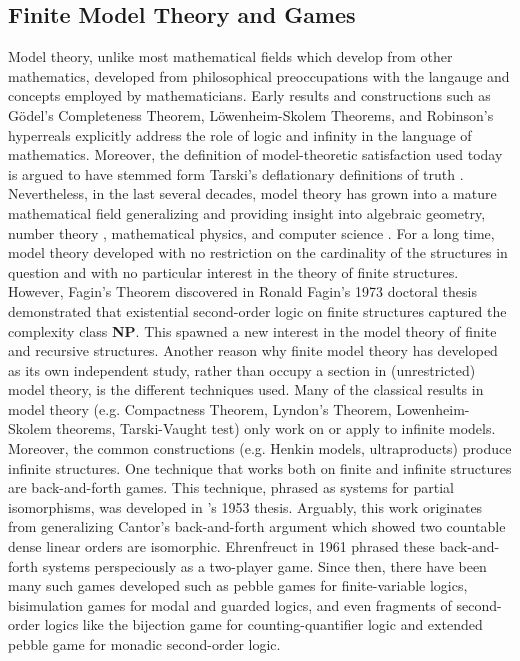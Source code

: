 \subsection{Finite Model Theory and Games}
Model theory, unlike most mathematical fields which develop from other mathematics, developed from philosophical preoccupations with the langauge and concepts employed by mathematicians. Early results and constructions such as G{\"o}del's Completeness Theorem, L{\"o}wenheim-Skolem Theorems, and Robinson's hyperreals explicitly address the role of logic and infinity in the language of mathematics. Moreover, the definition of model-theoretic satisfaction used today is argued to have stemmed form Tarski's deflationary definitions of truth \cite[]{Mancosu2010}. Nevertheless, in the last several decades, model theory has grown into a mature mathematical field generalizing and providing insight into algebraic geometry,  number theory , mathematical physics, and computer science . For a long time, model theory developed with no restriction on the cardinality of the structures in question and with no particular interest in the theory of finite structures. However, Fagin's Theorem discovered in Ronald Fagin's 1973 doctoral thesis demonstrated that existential second-order logic on finite structures captured the complexity class \textbf{NP}. This spawned a new interest in the model theory of finite and recursive structures.  Another reason why finite model theory has developed as its own independent study, rather than occupy a section in (unrestricted) model theory, is the different techniques used. Many of the classical results in model theory (e.g. Compactness Theorem, Lyndon's Theorem, Lowenheim-Skolem theorems, Tarski-Vaught test) only work on or apply to infinite models. Moreover, the common constructions (e.g. Henkin models, ultraproducts) produce infinite structures. One technique that works both on finite and infinite structures are back-and-forth games. This technique, phrased as systems for partial isomorphisms, was developed in {\Fraisse}'s 1953 thesis. Arguably, this work originates from generalizing Cantor's back-and-forth argument which showed two countable dense linear orders are isomorphic. Ehrenfreuct in 1961 phrased these back-and-forth systems perspeciously as a two-player game. Since then, there have been many such games developed such as pebble games \cite{Immerman1982} for finite-variable logics, bisimulation games \cite{Gradel2014} for modal and guarded logics, and even fragments of second-order logics like the bijection game \cite{Hella1996} for counting-quantifier logic and extended pebble game \cite{Libkin2004} for monadic second-order logic.
